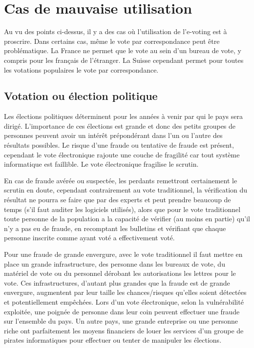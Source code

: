 \documentclass[../report]{subfiles}
\begin{document}
\section{Cas de mauvaise utilisation}

Au vu des points ci-dessus, il y a des cas où l'utilisation de l'e-voting est à proscrire. 
Dans certains cas, même le vote par correspondance peut être problématique. La France ne permet que 
le vote au sein d'un bureau de vote, y compris pour les français de l'étranger. La Suisse cependant 
permet pour toutes les votations populaires le vote par correspondance.

\subsection{Votation ou élection politique}

Les élections politiques déterminent pour les années à venir par qui le pays sera dirigé. 
L'importance de ces élections est grande et donc des petits groupes de personnes peuvent 
avoir un intérêt prépondérant dans l'un ou l'autre des résultats possibles. 
Le risque d'une fraude ou tentative de fraude est présent, cependant le vote électronique 
rajoute une couche de fragilité car tout système informatique est faillible.
Le vote électronique fragilise le scrutin.

En cas de fraude avérée ou suspectée, les perdants remettront certainement le scrutin en doute, 
cependant contrairement au vote traditionnel, la vérification du résultat ne pourra se faire que 
par des experts et peut prendre beaucoup de temps (s'il faut auditer les logiciels utilisés), alors que 
pour le vote traditionnel toute personne de la population a la capacité de vérifier (au moins en partie)
qu'il n'y a pas eu de fraude, en recomptant les bulletins et vérifiant que chaque personne inscrite comme ayant
voté a effectivement voté.

Pour une fraude de grande envergure, avec le vote traditionnel il faut mettre en place un grande infrastructure, des
personne dans les bureaux de vote, du matériel de vote ou du personnel dérobant les autorisations les lettres pour le vote.
Ces infrastructures, d'autant plus grandes que la fraude est de grande envergure, augmentent par leur taille les chances/risques qu'elles 
soient détectées et potentiellement empêchées. Lors d'un vote électronique, selon la vulnérabilité exploitée, une poignée
de personne dans leur coin peuvent effectuer une fraude sur l'ensemble du pays.
Un autre pays, une grande entreprise ou une personne riche ont parfaitement les moyens financiers de louer les services
d'un groupe de pirates informatiques pour effectuer ou tenter de manipuler les élections.
\end{document}
